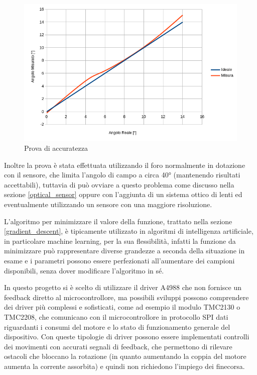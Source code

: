 \documentclass[12pt]{article}
\begin{document}
    \begin{figure}[h]
    \centering
        \includegraphics[width=\textwidth-50pt]{Draws/Accuracy_test.png}
        \caption{Prova di accuratezza}
        \label{accuracy_test}
    \end{figure}
     
    Inoltre la prova è stata effettuata utilizzando il foro normalmente in dotazione con il sensore, che limita l'angolo di campo a circa 40° (mantenendo risultati accettabili), tuttavia di può ovviare a questo problema come discusso nella sezione \ref{optical_sensor} oppure con l'aggiunta di un sistema ottico di lenti ed eventualmente utilizzando un sensore con una maggiore risoluzione.
    
    \vspace{1cm}
    L'algoritmo per minimizzare il valore della funzione, trattato nella sezione \ref{gradient_descent}, è tipicamente utilizzato in algoritmi di intelligenza artificiale, in particolare machine learning, per la sua flessibilità, infatti la funzione da minimizzare può rappresentare diverse grandezze a seconda della situazione in esame e i parametri possono essere perfezionati all'aumentare dei campioni disponibili, senza dover modificare l'algoritmo in sé.
    
    \newpage
    In questo progetto si è scelto di utilizzare il driver A4988 che non fornisce un feedback diretto al microcontrollore, ma possibili sviluppi possono comprendere dei driver più complessi e sofisticati, come ad esempio il modulo TMC2130 o TMC2208, che comunicano con il microcontrollore in protocollo SPI dati riguardanti i consumi del motore e lo stato di funzionamento generale del dispositivo. Con queste tipologie di driver possono essere implementati controlli dei movimenti con accurati segnali di feedback, che permettono di rilevare ostacoli che bloccano la rotazione (in quanto aumentando la coppia del motore aumenta la corrente assorbita) e quindi non richiedono l'impiego dei finecorsa.
    
\end{document}
